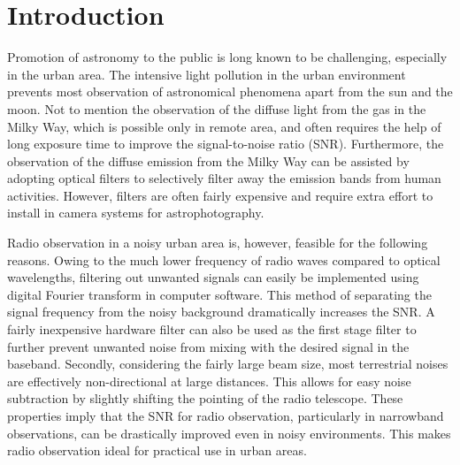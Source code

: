 \documentclass[12pt]{article}
\begin{document}
	
	\setcounter{page}{1}
	\setcounter{footnote}{0}
	
	\tableofcontents
	
	\parskip=5pt
	

	\section{Introduction}
    Promotion of astronomy to the public is long known to be challenging, especially in the urban area. 
    The intensive light pollution in the urban environment prevents most observation of astronomical phenomena apart from the sun and the moon.
    Not to mention the observation of the diffuse light from the gas in the Milky Way, which is possible only in remote area, and often requires the help of long exposure time to improve the signal-to-noise ratio (SNR).
    Furthermore, the observation of the diffuse emission from the Milky Way can be assisted by adopting optical filters to selectively filter away the emission bands from human activities. 
    However, filters are often fairly expensive and require extra effort to install in camera systems for astrophotography. 

    Radio observation in a noisy urban area is, however, feasible for the following reasons.
    Owing to the much lower frequency of radio waves compared to optical wavelengths, filtering out unwanted signals can easily be implemented using digital Fourier transform in computer software. This method of separating the signal frequency from the noisy background dramatically increases the SNR.
    A fairly inexpensive hardware filter can also be used as the first stage filter to further prevent unwanted noise from mixing with the desired signal in the baseband.
    Secondly, considering the fairly large beam size, most terrestrial noises are effectively non-directional at large distances. This allows for easy noise subtraction by slightly shifting the pointing of the radio telescope.
    These properties imply that the SNR for radio observation, particularly in narrowband observations, can be drastically improved even in noisy environments. This makes radio observation ideal for practical use in urban areas.
\end{document}
